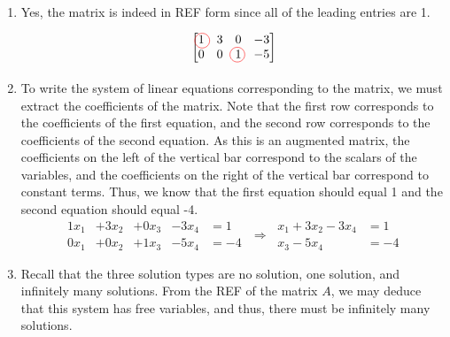 \begin{SaveQuestion}
\begin{enumerate}
        \item Yes, the matrix is indeed in REF form since all of the leading entries are 1.
        $$
        \begin{tikzpicture}
        \draw (0,0) node{$\begin{bmatrix} 1 & 3 & 0 & -3 \\ 0 & 0 & 1 & -5\end{bmatrix}$};
        \draw[red] (-0.9,0.20) circle (6pt);
        \draw[red] (0.1,-0.20) circle (6pt);
        \end{tikzpicture}
        $$
        \item To write the system of linear equations corresponding to the matrix, we must extract the coefficients of the matrix. Note that the first row corresponds to the coefficients of the first equation, and the second row corresponds to the coefficients of the second equation. As this is an augmented matrix, the coefficients on the left of the vertical bar correspond to the scalars of the variables, and the coefficients on the right of the vertical bar correspond to constant terms. Thus, we know that the first equation should equal 1 and the second equation should equal -4. 
        $$\begin{matrix} 1x_1 & +3x_2 & +0x_3 & -3x_4 & = 1 \ \ \ \  \\ 0x_1 & + 0x_2 & +1x_3 & -5x_4 & = -4 \end{matrix} \ \Longrightarrow \ \begin{matrix} x_1 + 3x_2 - 3x_4 & = 1 \ \ \ \  \\ x_3 - 5x_4 & = -4 \end{matrix}$$
        
        \item Recall that the three solution types are no solution, one solution, and infinitely many solutions. From the REF of the matrix $A$, we may deduce that this system has free variables, and thus, there must be infinitely many solutions. 
        

\end{enumerate}
\end{SaveQuestion}
